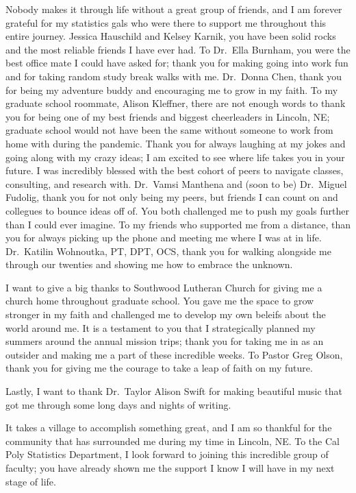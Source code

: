 \documentclass[print]{nuthesis}
\begin{document}
\begin{acknowledgments}
Nobody makes it through life without a great group of friends, and I am forever grateful for my statistics gals who were there to support me throughout this entire journey. Jessica Hauschild and Kelsey Karnik, you have been solid rocks and the most reliable friends I have ever had. To Dr.~Ella Burnham, you were the best office mate I could have asked for; thank you for making going into work fun and for taking random study break walks with me. Dr.~Donna Chen, thank you for being my adventure buddy and encouraging me to grow in my faith. To my graduate school roommate, Alison Kleffner, there are not enough words to thank you for being one of my best friends and biggest cheerleaders in Lincoln, NE; graduate school would not have been the same without someone to work from home with during the pandemic. Thank you for always laughing at my jokes and going along with my crazy ideas; I am excited to see where life takes you in your future. I was incredibly blessed with the best cohort of peers to navigate classes, consulting, and research with. Dr.~Vamsi Manthena and (soon to be) Dr.~Miguel Fudolig, thank you for not only being my peers, but friends I can count on and collegues to bounce ideas off of. You both challenged me to push my goals further than I could ever imagine. To my friends who supported me from a distance, than you for always picking up the phone and meeting me where I was at in life. Dr.~Katilin Wohnoutka, PT, DPT, OCS, thank you for walking alongside me through our twenties and showing me how to embrace the unknown.

I want to give a big thanks to Southwood Lutheran Church for giving me a church home throughout graduate school. You gave me the space to grow stronger in my faith and challenged me to develop my own beleifs about the world around me. It is a testament to you that I strategically planned my summers around the annual mission trips; thank you for taking me in as an outsider and making me a part of these incredible weeks. To Pastor Greg Olson, thank you for giving me the courage to take a leap of faith on my future.

Lastly, I want to thank Dr.~Taylor Alison Swift for making beautiful music that got me through some long days and nights of writing.

It takes a village to accomplish something great, and I am so thankful for the community that has surrounded me during my time in Lincoln, NE. To the Cal Poly Statistics Department, I look forward to joining this incredible group of faculty; you have already shown me the support I know I will have in my next stage of life.
\end{acknowledgments}
\end{document}
